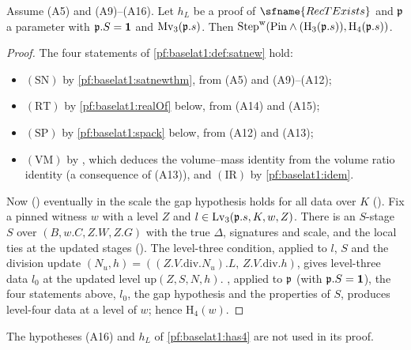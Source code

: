\begin{theorem}\label{pf:baselat1:has4}
Assume (A5) and (A9)--(A16). Let $h_L$ be a
proof of $\sfname{RecTExists}$ and $\mathfrak p$ a parameter with $\mathfrak p.S=\mathbf{1}$ and
$\mathrm{Mv}_3(\mathfrak p.s)$. Then
$\mathrm{Step}^{\mathrm w}(\mathrm{Pin}\wedge(\mathrm{H}_3(\mathfrak p.s)),\mathrm{H}_4(\mathfrak p.s))$.
\end{theorem}

\begin{proof}
The four statements of \cref{pf:baselat1:def:satnew} hold:
\begin{itemize}
\item $(\mathrm{SN})$ by \cref{pf:baselat1:satnewthm}, from (A5) and (A9)--(A12);
\item $(\mathrm{RT})$ by \cref{pf:baselat1:realOf} below, from (A14) and (A15);
\item $(\mathrm{SP})$ by \cref{pf:baselat1:spack} below, from (A12) and (A13);
\item $(\mathrm{VM})$ by , which deduces the
  volume--mass identity from the volume ratio identity 
  (a consequence of (A13)), and $(\mathrm{IR})$ by \cref{pf:baselat1:idem}.
\end{itemize}
Now () eventually in the scale the gap
hypothesis holds for all data over $K$ (). Fix a pinned
witness $w$ with a level $Z$ and $l\in\mathrm{Lv}_3(\mathfrak p.s,K,w,Z)$. There is an $S$-stage $S$ over
$(B,w.C,Z.W,Z.G)$ with the true $\Delta$, signatures and scale, and the local ties at the updated stages
(). The level-three condition, applied to $l$, $S$ and the
division update $(N_u,h)=((Z.V.\mathrm{div}.N_u).L,\,Z.V.\mathrm{div}.h)$, gives level-three data $l_0$ at the
updated level $\mathrm{up}(Z,S,N,h)$. , applied
to $\mathfrak p$ (with $\mathfrak p.S=\mathbf{1}$), the four statements above, $l_0$, the gap
hypothesis and the properties of $S$, produces level-four data at a level of $w$; hence $\mathrm{H}_4(w)$.
\end{proof}

\begin{remark}\label{pf:baselat1:rem:has4}
The hypotheses (A16) and $h_L$ of \cref{pf:baselat1:has4} are not used in its proof.
\end{remark}

